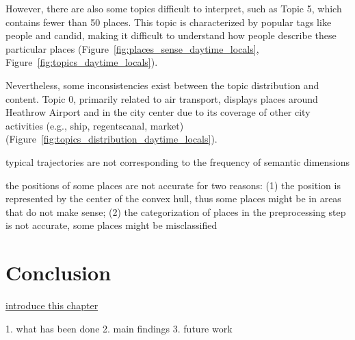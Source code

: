 \documentclass{article}
\theoremstyle{remark}
\begin{document}
However, there are also some topics difficult to interpret, such as Topic 5, which contains fewer than 50 places. This topic is characterized by popular tags like people and candid, making it difficult to understand how people describe these particular places (Figure~\ref{fig:places_sense_daytime_locals}, Figure~\ref{fig:topics_daytime_locals}).

Nevertheless, some inconsistencies exist between the topic distribution and content. Topic 0, primarily related to air transport, displays places around Heathrow Airport and in the city center due to its coverage of other city activities (e.g., ship, regentscanal, market) (Figure~\ref{fig:topics_distribution_daytime_locals}).


typical trajectories are not corresponding to the frequency of semantic dimensions

the positions of some places are not accurate for two reasons: (1) the position is represented by the center of the convex hull, thus some places might be in areas that do not make sense; (2) the categorization of places in the preprocessing step is not accurate, some places might be misclassified

\clearpage


\section{Conclusion}
\underline{introduce this chapter}

1. what has been done
2. main findings
3. future work


\clearpage






\clearpage


\appendix
\end{document}
